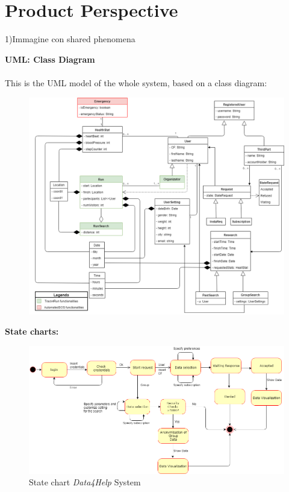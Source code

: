 \section{Product Perspective}
1)Immagine con shared phenomena

\textbf{UML: Class Diagram}\\ \\
This is the UML model of  the whole system, based on a class diagram:
\begin{figure}[H]
    \centering
    \includegraphics[scale=0.4]{Pictures/UML.png}
  
\end{figure}

\newpage
\textbf{State charts:}

\begin{figure}[H]
    \centering
    \includegraphics[scale=0.4]{Pictures/state chart 1.png}
    \caption{State chart  \emph{Data4Help} System}
\end{figure}

